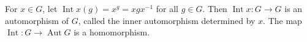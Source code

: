 For $x \in G$, let $\operatorname{Int} x(g) = x^g = xgx^{-1}$ for all $g \in G$. Then $\operatorname{Int} x: G \to G$ is an automorphism of $G$, called the inner automorphism determined by $x$. The map $\operatorname{Int}: G \to \operatorname{Aut} G$ is a homomorphism.
